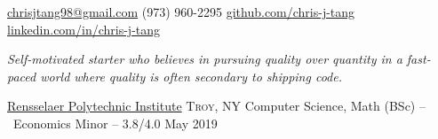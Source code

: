 \documentclass[11pt,a4paper]{article}
\begin{document}
\sloppy  %



\nobreakvspace{0.3em}  %

\noindent\href{mailto:chrisjtang98.at.gmail.dot.com}{chrisjtang98\mbox{}@\mbox{}gmail.com}\sbull
\textsmaller(973) 960-2295\sbull
\href{https://github.com/chris-j-tang}{github.com/chris-j-tang}\sbull
\href{https://www.linkedin.com/in/chris-j-tang/}{linkedin.com/in/chris-j-tang}

\spacedhrule{0.9em}{-0.4em}  %


\vspace{-1.8em}  %
{\bodytext \noindent \emph{Self-motivated starter who believes in pursuing quality over quantity in a fast-paced world where quality is often secondary to shipping code.}}

\vspace{0.5em}
\spacedhrule{0em}{-0.4em}


\headedsection
  {\href{http://rpi.edu/}{Rensselaer Polytechnic Institute}}
  {\textsc{Troy, NY}} {%
  \headedsubsection
    {Computer Science, Math (BSc) -- \textnormal{~Economics Minor} -- 3.8/4.0}
    {May 2019} {\\}
}

\spacedhrule{0em}{-0.4em}

\end{document}
